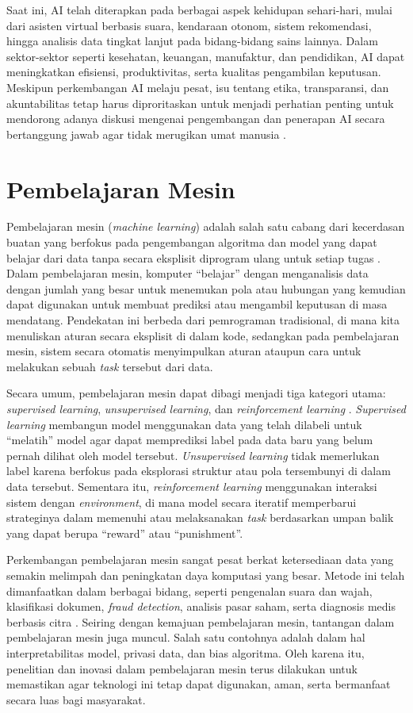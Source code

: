 Saat ini, AI telah diterapkan pada berbagai aspek kehidupan sehari-hari, mulai dari asisten virtual berbasis suara, kendaraan otonom, sistem rekomendasi, hingga analisis data tingkat lanjut pada bidang-bidang sains lainnya. Dalam sektor-sektor seperti kesehatan, keuangan, manufaktur, dan pendidikan, AI dapat meningkatkan efisiensi, produktivitas, serta kualitas pengambilan keputusan. Meskipun perkembangan AI melaju pesat, isu tentang etika, transparansi, dan akuntabilitas tetap harus diproritaskan untuk menjadi perhatian penting untuk mendorong adanya diskusi mengenai pengembangan dan penerapan AI secara bertanggung jawab agar tidak merugikan umat manusia \parencite{JobinEtAl2019}.

\section{Pembelajaran Mesin}
Pembelajaran mesin (\textit{machine learning}) adalah salah satu cabang dari kecerdasan buatan yang berfokus pada pengembangan algoritma dan model yang dapat belajar dari data tanpa secara eksplisit diprogram ulang untuk setiap tugas \parencite{Mitchell1997}. Dalam pembelajaran mesin, komputer “belajar” dengan menganalisis data dengan jumlah yang besar untuk menemukan pola atau hubungan yang kemudian dapat digunakan untuk membuat prediksi atau mengambil keputusan di masa mendatang. Pendekatan ini berbeda dari pemrograman tradisional, di mana kita menuliskan aturan secara eksplisit di dalam kode, sedangkan pada pembelajaran mesin, sistem secara otomatis menyimpulkan aturan ataupun cara untuk melakukan sebuah \textit{task} tersebut dari data.

Secara umum, pembelajaran mesin dapat dibagi menjadi tiga kategori utama: \textit{supervised learning}, \textit{unsupervised learning}, dan \textit{reinforcement learning} \parencite{Goodfellow-et-al-2016}. \textit{Supervised learning} membangun model menggunakan data yang telah dilabeli untuk “melatih” model agar dapat memprediksi label pada data baru yang belum pernah dilihat oleh model tersebut. \textit{Unsupervised learning } tidak memerlukan label karena berfokus pada eksplorasi struktur atau pola tersembunyi di dalam data tersebut. Sementara itu, \textit{reinforcement learning} menggunakan interaksi sistem dengan \textit{environment}, di mana model secara iteratif memperbarui strateginya dalam memenuhi atau melaksanakan \textit{task} berdasarkan umpan balik yang dapat berupa “reward” atau “punishment”.

Perkembangan pembelajaran mesin sangat pesat berkat ketersediaan data yang semakin melimpah dan peningkatan daya komputasi yang besar. Metode ini telah dimanfaatkan dalam berbagai bidang, seperti pengenalan suara dan wajah, klasifikasi dokumen, \textit{fraud detection}, analisis pasar saham, serta diagnosis medis berbasis citra \parencite{MohriRostamizadehTalwalkar2018}. Seiring dengan kemajuan pembelajaran mesin, tantangan dalam pembelajaran mesin juga muncul. Salah satu contohnya adalah dalam hal interpretabilitas model, privasi data, dan bias algoritma. Oleh karena itu, penelitian dan inovasi dalam pembelajaran mesin terus dilakukan untuk memastikan agar teknologi ini tetap dapat digunakan, aman, serta bermanfaat secara luas bagi masyarakat.


